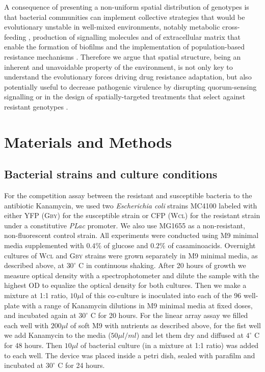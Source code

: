 \documentclass[fleqn,12pt]{wlscirep}
\begin{document}
A consequence of presenting a non-uniform spatial distribution of genotypes is that bacterial communities can implement collective strategies\cite{Pena2016} that would be evolutionary unstable in well-mixed environments, notably metabolic cross-feeding \cite{Pande2016},  production of signalling molecules \cite{Lee2010} and of extracellular matrix \cite{Nadell2017} that enable the formation of biofilms \cite{Flemming2016} and the implementation of population-based resistance mechanisms \cite{Lee2010,Estrela2018}.  Therefore we argue that spatial structure, being an inherent and unavoidable property of the environment, is not only key to understand the evolutionary forces driving drug resistance adaptation, but also potentially useful to decrease pathogenic virulence by disrupting quorum-sensing signalling \cite{Maeda2012,Kim2016} or in the design of spatially-targeted treatments that select against resistant genotypes \cite{Okamoto2018}.  



\section*{Materials and Methods}


\subsection*{Bacterial strains and culture conditions}

For the competition assay between the resistant and susceptible bacteria to the antibiotic Kanamycin, we used two \textit{Escherichia coli} strains MC4100 \cite{Chait2007,Chait2010} labeled with either YFP (\textsc{Gby}) for the susceptible strain or CFP  (\textsc{Wcl}) for the resistant strain under a constitutive \textit{PLac} promoter. We also use MG1655 as a non-resistant, non-fluorescent control strain. All experiments were conducted using M9 \cite{} minimal media supplemented with $0.4\%$ of glucose and $0.2\%$ of casaminoacids.
Overnight cultures of \textsc{Wcl} and \textsc{Gby} strains were grown separately in M9 minimal media, as described above, at $30^{\circ}$ C in continuous shaking. After 20 hours of growth we measure optical density with a spectrophotometer and dilute the sample with the highest OD to equalize the optical density for both cultures. Then we make a mixture at 1:1 ratio, $10\mu$l of this co-culture is inoculated into each of the 96 well-plate with a range of Kanamycin dilutions in M9 minimal media at fixed doses, and incubated again at $30^{\circ}$ C for 20 hours. 
For the linear array assay we filled each well with $200 \mu l$ of soft M9 with nutrients as described above, for the fist well we add Kanamycin to the media ($50 \mu l/ml$) and let them dry and diffused at $4^ \circ$ C for 48 hours.  Then $10\mu l$ of bacterial culture (in a mixture at 1:1 ratio) was added to each well. The device was placed inside a petri dish, sealed with parafilm and incubated at $30^\circ$ C for 24 hours. 
\end{document}
